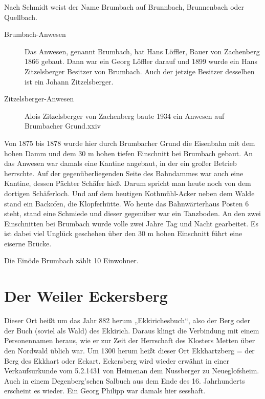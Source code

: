 \documentclass{book}
\begin{document}
Nach Schmidt weist der Name Brumbach auf Brunnbach, Brunnenbach oder Quellbach.

\begin{description}
\item[Brumbach-Anwesen] Das Anwesen, genannt Brumbach, hat Hans Löffler, Bauer
von Zachenberg 1866 gebaut. Dann war ein Georg Löffler darauf und 1899 wurde ein
Hans Zitzelsberger Besitzer von Brumbach. Auch der jetzige Besitzer desselben
ist ein Johann Zitzelsberger.

\item[Zitzelsberger-Anwesen] Alois Zitzelsberger von Zachenberg baute 1934 ein
Anwesen auf Brumbacher Grund.xxiv
\end{description}

Von 1875 bis 1878 wurde hier durch Brumbacher Grund die Eisenbahn mit dem hohen
Damm und dem 30 m hohen tiefen Einschnitt bei Brumbach gebaut. An das Anwesen
war damals eine Kantine angebaut, in der ein großer Betrieb herrschte. Auf der
gegenüberliegenden Seite des Bahndammes war auch eine Kantine, dessen Pächter
Schäfer hieß. Darum spricht man heute noch von dem dortigen Schäferloch. Und auf
dem heutigen Kothmühl-Acker neben dem Walde stand ein Backofen, die
Klopferhütte. Wo heute das Bahnwärterhaus Posten 6 steht, stand eine Schmiede
und dieser gegenüber war ein Tanzboden. An den zwei Einschnitten bei Brumbach
wurde volle zwei Jahre Tag und Nacht gearbeitet. Es ist dabei viel Unglück
geschehen über den 30 m hohen Einschnitt führt eine eiserne Brücke.

Die Einöde Brumbach zählt 10 Einwohner.

\section{Der Weiler Eckersberg}

Dieser Ort heißt um das Jahr 882 herum „Ekkirichesbuch“, also der Berg oder der
Buch (soviel als Wald) des Ekkirich. Daraus klingt die Verbindung mit einem
Personennamen heraus, wie er zur Zeit der Herrschaft des Klosters Metten über
den Nordwald üblich war. Um 1300 herum heißt dieser Ort Ekkhartzberg = der Berg
des Ekkhart oder Eckart. Eckersberg wird wieder erwähnt in einer Verkaufsurkunde
vom 5.2.1431 von Heimenan dem Nussberger zu Neueglofsheim. Auch in einem
Degenberg'schen Salbuch aus dem Ende des 16. Jahrhunderts erscheint es wieder.
Ein Georg Philipp war damals hier sesshaft.
\end{document}
